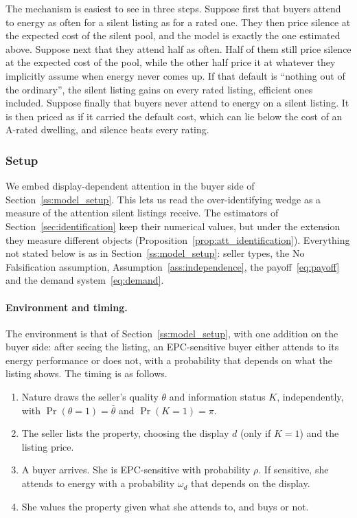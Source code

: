 The mechanism is easiest to see in three steps. Suppose first that buyers attend to energy as often for a silent listing as for a rated one. They then price silence at the expected cost of the silent pool, and the model is exactly the one estimated above. Suppose next that they attend half as often. Half of them still price silence at the expected cost of the pool, while the other half price it at whatever they implicitly assume when energy never comes up. If that default is ``nothing out of the ordinary'', the silent listing gains on every rated listing, efficient ones included. Suppose finally that buyers never attend to energy on a silent listing. It is then priced as if it carried the default cost, which can lie below the cost of an A-rated dwelling, and silence beats every rating.

\subsubsection{Setup}
\label{ss:att_setup}

We embed display-dependent attention in the buyer side of Section~\ref{ss:model_setup}. This lets us read the over-identifying wedge as a measure of the attention silent listings receive. The estimators of Section~\ref{sec:identification} keep their numerical values, but under the extension they measure different objects (Proposition~\ref{prop:att_identification}). Everything not stated below is as in Section~\ref{ss:model_setup}: seller types, the No Falsification assumption, Assumption~\ref{ass:independence}, the payoff~\eqref{eq:payoff} and the demand system~\eqref{eq:demand}.

\paragraph{Environment and timing.}
The environment is that of Section~\ref{ss:model_setup}, with one addition on the buyer side: after seeing the listing, an EPC-sensitive buyer either attends to its energy performance or does not, with a probability that depends on what the listing shows. The timing is as follows.
\begin{enumerate}[label=(\arabic*)]
    \item Nature draws the seller's quality $\theta$ and information status $K$, independently, with $\Pr(\theta=1)=\bar\theta$ and $\Pr(K=1)=\pi$.
    \item The seller lists the property, choosing the display $d$ (only if $K=1$) and the listing price.
    \item A buyer arrives. She is EPC-sensitive with probability $\rho$. If sensitive, she attends to energy with a probability $\omega_d$ that depends on the display.
    \item She values the property given what she attends to, and buys or not.
\end{enumerate}


